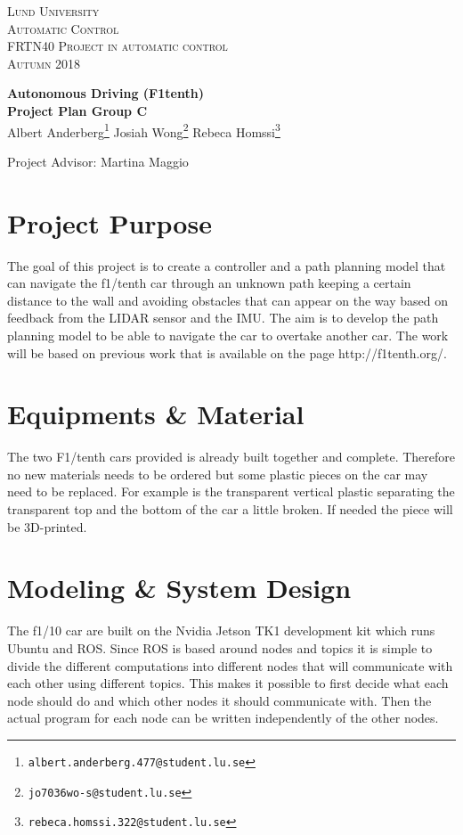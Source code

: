 \documentclass{article}
\begin{document}
\begin{titlepage}
  \begin{flushleft}\scshape
    Lund University\\
    Automatic Control\\[\smallskipamount]
    FRTN40 Project in automatic control\\
    Autumn 2018
  \end{flushleft}
  \vspace*{0pt plus 0.3fill}
  \begin{center}
    \huge \textbf{Autonomous Driving (F1tenth) }\\[4mm]     
    \large\textbf{Project Plan Group C}\\[5mm]
         Albert Anderberg\footnote{\texttt{albert.anderberg.477@student.lu.se}}\quad
         Josiah Wong\footnote{\texttt{jo7036wo-s@student.lu.se}}\quad
         Rebeca Homssi\footnote{\texttt{rebeca.homssi.322@student.lu.se}}
  \end{center}
\begin{center}
    Project Advisor: Martina Maggio
\end{center}
\vfill
\end{titlepage}        

\section{Project Purpose}
The goal of this project is to create a controller and a path planning model that can navigate the f1/tenth car through an unknown path keeping a certain distance to the wall and avoiding obstacles that can appear on the way based on feedback from the LIDAR sensor and the IMU. The aim is to develop the path planning model to be able to navigate the car to overtake another car. The work will be based on previous work that is available on the page http://f1tenth.org/.

\section{Equipments \& Material} \label{sec:equipment}
The two F1/tenth cars provided is already built together and complete. Therefore no new materials needs to be ordered but some plastic pieces on the car may need to be replaced. For example is the transparent vertical plastic separating the transparent top and the bottom of the car a little broken. If needed the piece will be 3D-printed.

\section{Modeling \& System Design}
The f1/10 car are built on the Nvidia Jetson TK1 development kit which runs Ubuntu and ROS. Since ROS is based around nodes and topics it is simple to divide the different computations into different nodes that will communicate with each other using different topics. This makes it possible to first decide what each node should do and which other nodes it should communicate with. Then the actual program for each node can be written independently of the other nodes.
\end{document}
